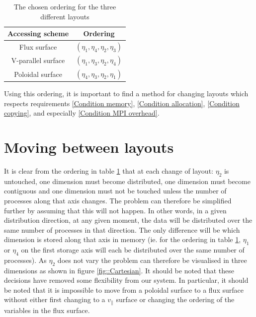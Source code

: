 \begin{table}[ht]
\centering
 \begin{tabular}{|c|c|}
  \hline
  Accessing scheme & Ordering\\
  \hline
  Flux surface & $(\eta_1,\eta_4,\eta_2,\eta_3)$\\
  \hline
  V-parallel surface & $(\eta_1,\eta_3,\eta_2,\eta_4)$\\
  \hline
  Poloidal surface & $(\eta_4,\eta_3,\eta_2,\eta_1)$\\
  \hline
 \end{tabular}
 \caption{\label{tab::Ordering} The chosen ordering for the three different layouts}
\end{table}

Using this ordering, it is important to find a method for changing layouts which respects requirements \ref{Condition memory}, \ref{Condition allocation}, \ref{Condition copying}, and especially \ref{Condition MPI overhead}.

\section{Moving between layouts}

It is clear from the ordering in table \ref{tab::Ordering} that at each change of layout: $\eta_2$ is untouched, one dimension must become distributed, one dimension must become contiguous and one dimension must not be touched unless the number of processes along that axis changes. The problem can therefore be simplified further by assuming that this will not happen. In other words, in a given distribution direction, at any given moment, the data will be distributed over the same number of processes in that direction. The only difference will be which dimension is stored along that axis in memory (ie. for the ordering in table \ref{tab::Ordering}, $\eta_1$ or $\eta_4$ on the first storage axis will each be distributed over the same number of processes).
As $\eta_2$ does not vary the problem can therefore be visualised in three dimensions as shown in figure \ref{fig::Cartesian}. It should be noted that these decisions have removed some flexibility from our system. In particular, it should be noted that it is impossible to move from a poloidal surface to a flux surface without either first changing to a $v_\parallel$ surface or changing the ordering of the variables in the flux surface.


